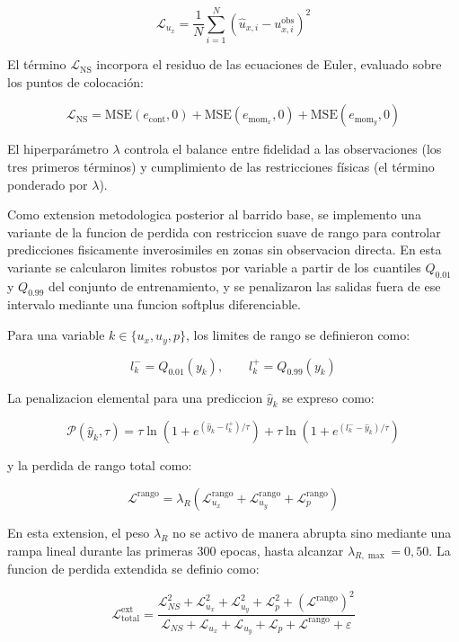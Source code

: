 \[
\mathcal{L}_{u_x} = \frac{1}{N}\sum_{i=1}^N \left(\hat{u}_{x,i} - u_{x,i}^{\text{obs}}\right)^2
\]

El término $\mathcal{L}_{\text{NS}}$ incorpora el residuo de las ecuaciones de Euler, evaluado sobre los puntos de colocación:

\[
\mathcal{L}_{\text{NS}} = \text{MSE}(e_{\text{cont}}, 0) + \text{MSE}(e_{\text{mom}_x}, 0) + \text{MSE}(e_{\text{mom}_y}, 0)
\]

El hiperparámetro $\lambda$ controla el balance entre fidelidad a las observaciones (los tres primeros términos) y cumplimiento de las restricciones físicas (el término ponderado por $\lambda$).

Como extension metodologica posterior al barrido base, se implemento una variante de la funcion de perdida con restriccion suave de rango para controlar predicciones fisicamente inverosimiles en zonas sin observacion directa. En esta variante se calcularon limites robustos por variable a partir de los cuantiles $Q_{0.01}$ y $Q_{0.99}$ del conjunto de entrenamiento, y se penalizaron las salidas fuera de ese intervalo mediante una funcion softplus diferenciable.

Para una variable $k \in \{u_x, u_y, p\}$, los limites de rango se definieron como:

\[
l_k^- = Q_{0.01}(y_k), \qquad l_k^+ = Q_{0.99}(y_k)
\]

La penalizacion elemental para una prediccion $\hat{y}_k$ se expreso como:

\[
\mathcal{P}(\hat{y}_k, \tau) =
\tau \ln\!\left(1 + e^{(\hat{y}_k-l_k^+)/\tau}\right)
+
\tau \ln\!\left(1 + e^{(l_k^- - \hat{y}_k)/\tau}\right)
\]

y la perdida de rango total como:

\[
\mathcal{L}^{\text{rango}} = \lambda_R \left(\mathcal{L}^{\text{rango}}_{u_x} + \mathcal{L}^{\text{rango}}_{u_y} + \mathcal{L}^{\text{rango}}_{p}\right)
\]

En esta extension, el peso $\lambda_R$ no se activo de manera abrupta sino mediante una rampa lineal durante las primeras 300 epocas, hasta alcanzar $\lambda_{R,\max}=0{,}50$. La funcion de perdida extendida se definio como:

\[
\mathcal{L}_{\text{total}}^{\text{ext}} =
\frac{\mathcal{L}_{NS}^2 + \mathcal{L}_{u_x}^2 + \mathcal{L}_{u_y}^2 + \mathcal{L}_{p}^2 + \left(\mathcal{L}^{\text{rango}}\right)^2}
{\mathcal{L}_{NS} + \mathcal{L}_{u_x} + \mathcal{L}_{u_y} + \mathcal{L}_{p} + \mathcal{L}^{\text{rango}} + \varepsilon}
\]

